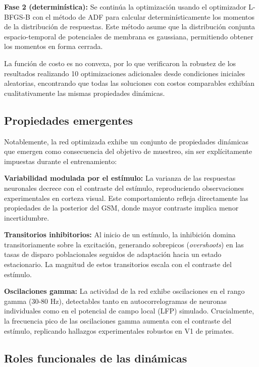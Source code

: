 \textbf{Fase 2 (determinística):} Se continúa la optimización usando el optimizador \acrshort{L-BFGS-B} con el método de \acrfull{ADF} para calcular determinísticamente los momentos de la distribución de respuestas. Este método asume que la distribución conjunta espacio-temporal de potenciales de membrana es gaussiana, permitiendo obtener los momentos en forma cerrada.

La función de costo es no convexa, por lo que \citeauthor{echeveste2020cortical} verificaron la robustez de los resultados realizando 10 optimizaciones adicionales desde condiciones iniciales aleatorias, encontrando que todas las soluciones con costos comparables exhibían cualitativamente las mismas propiedades dinámicas.

\subsection{Propiedades emergentes}
\label{subsec:echeveste_propiedades}

Notablemente, la red optimizada exhibe un conjunto de propiedades dinámicas que emergen como consecuencia del objetivo de muestreo, sin ser explícitamente impuestas durante el entrenamiento:

\textbf{Variabilidad modulada por el estímulo:} La varianza de las respuestas neuronales decrece con el contraste del estímulo, reproduciendo observaciones experimentales en corteza visual. Este comportamiento refleja directamente las propiedades de la posterior del \acrshort{GSM}, donde mayor contraste implica menor incertidumbre.

\textbf{Transitorios inhibitorios:} Al inicio de un estímulo, la inhibición domina transitoriamente sobre la excitación, generando sobrepicos (\textit{overshoots}) en las tasas de disparo poblacionales seguidos de adaptación hacia un estado estacionario. La magnitud de estos transitorios escala con el contraste del estímulo.

\textbf{Oscilaciones gamma:} La actividad de la red exhibe oscilaciones en el rango gamma (30-80 Hz), detectables tanto en autocorrelogramas de neuronas individuales como en el potencial de campo local (LFP) simulado. Crucialmente, la frecuencia pico de las oscilaciones gamma aumenta con el contraste del estímulo, replicando hallazgos experimentales robustos en V1 de primates.

\subsection{Roles funcionales de las dinámicas}
\label{subsec:echeveste_roles}


